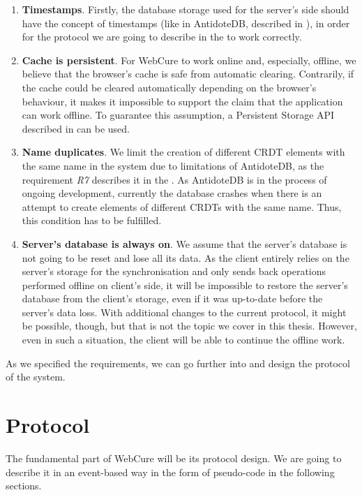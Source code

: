 \begin{enumerate}
\item {\textbf{Timestamps}. Firstly, the database storage used for the server's side should have the concept of timestamps (like in AntidoteDB, described in ), in order for the protocol we are going to describe in the  to work correctly.}
\item {\textbf{Cache is persistent}. For WebCure to work online and, especially, offline, we believe that the browser's cache is safe from automatic clearing. Contrarily, if the cache could be cleared automatically depending on the browser's behaviour, it makes it impossible to support the claim that the application can work offline. To guarantee this assumption, a Persistent Storage API described in  can be used.}
\item{\textbf{Name duplicates}. We limit the creation of different CRDT elements with the same name in the system due to limitations of AntidoteDB, as the requirement \textit{R7} describes it in the . As AntidoteDB is in the process of ongoing development, currently the database crashes when there is an attempt to create elements of different CRDTs with the same name. Thus, this condition has to be fulfilled.}
\item{\textbf{Server's database is always on}. We assume that the server's database is not going to be reset and lose all its data. As the client entirely relies on the server's storage for the synchronisation and only sends back operations performed offline on client's side, it will be impossible to restore the server's database from the client's storage, even if it was up-to-date before the server's data loss. With additional changes to the current protocol, it might be possible, though, but that is not the topic we cover in this thesis. However, even in such a situation, the client will be able to continue the offline work.}
\end{enumerate}

As we specified the requirements, we can go further into and design the protocol of the system.

\section{Protocol}
\label{4-protocol}

The fundamental part of WebCure will be its protocol design. We are going to describe it in an event-based way in the form of pseudo-code in the following sections. 


